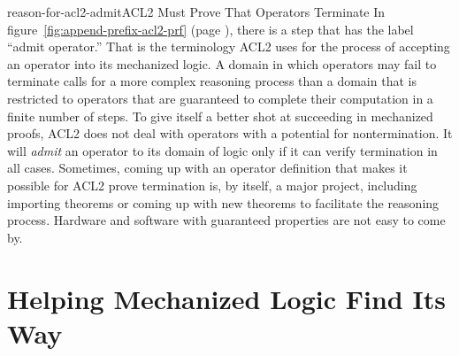 \begin{aside}{reason-for-acl2-admit}{ACL2 Must Prove That Operators Terminate}
In figure~\ref{fig:append-prefix-acl2-prf} (page \pageref{fig:append-prefix-acl2-prf}),
there is a step that has the label ``admit operator.''
That is the terminology ACL2 uses for the process of accepting
an operator into its mechanized logic.
A domain in which operators may fail to terminate
calls for a more complex reasoning process than a domain that is
restricted to operators that are guaranteed to complete their
computation in a finite number of steps.
To give itself a better shot at succeeding in mechanized proofs,
ACL2 does not deal with operators with a potential for nontermination.
It will \emph{admit} an operator to its domain of logic
only if it can verify termination in all cases.
Sometimes, coming up with an operator definition that makes
it possible for ACL2 prove termination is, by itself,
a major project, including importing theorems or coming up with new
theorems to facilitate the reasoning process.
Hardware and software with guaranteed properties are not easy to come
by.
\end{aside}

\begin{exercises}




\end{exercises}

\section{Helping Mechanized Logic Find Its Way}
\label{sec:lemmas}

